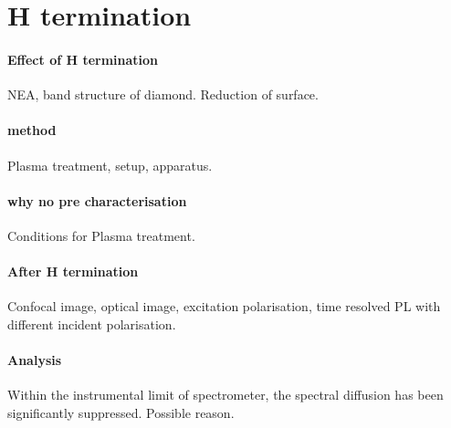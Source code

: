 
\section[H termination]{H termination}
\paragraph{Effect of H termination}
NEA, band structure of diamond. Reduction of surface.
\paragraph{method} Plasma treatment, setup, apparatus.
\paragraph{why no pre characterisation} Conditions for Plasma treatment.
\paragraph{After H termination} Confocal image, optical image, excitation polarisation, time resolved PL with different incident polarisation.
\paragraph{Analysis} Within the instrumental limit of spectrometer, the spectral diffusion has been significantly suppressed. Possible reason.